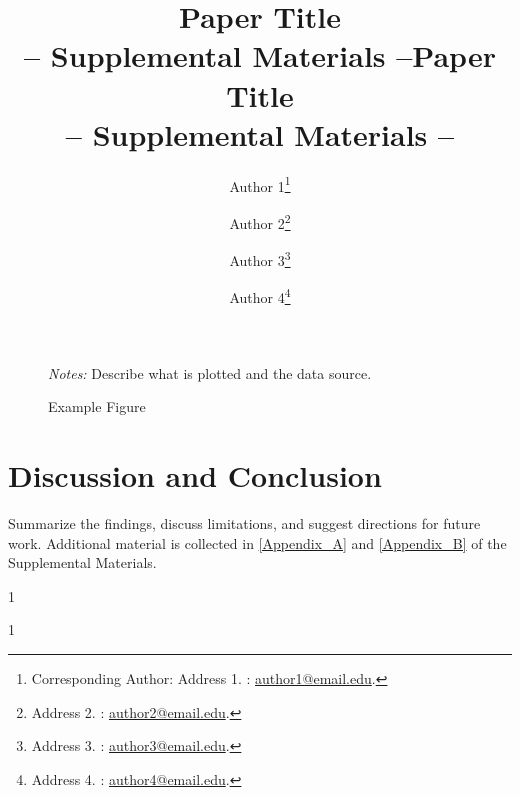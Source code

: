 \documentclass[12pt]{article}
\makeatletter
\newcommand{\blind}{1}
\newcommand{\papertitle}{Paper Title}
\newcommand{\paperauthors}{%
    Author 1\thanks{Corresponding Author: Address 1. \faEnvelopeO: \href{mailto:author1@email.edu}{author1@email.edu}.} \and
    Author 2\thanks{Address 2. \faEnvelopeO: \href{mailto:author2@email.edu}{author2@email.edu}.} \and
    Author 3\thanks{Address 3. \faEnvelopeO: \href{mailto:author3@email.edu}{author3@email.edu}.} \and
    Author 4\thanks{Address 4. \faEnvelopeO: \href{mailto:author4@email.edu}{author4@email.edu}.}%
}
\makeatother
\begin{document}
\begin{bibunit}[jpe]
\begin{figure}[H]
\centering
{}
\caption{Example Figure}
\label{fig:example}
\begin{minipage}{0.9\textwidth}
\footnotesize \textit{Notes:} Describe what is plotted and the data source.
\end{minipage}
\end{figure}

\section{Discussion and Conclusion}\label{sec:conclusion}
Summarize the findings, discuss limitations, and suggest directions for future work. Additional material is collected in \ref{Appendix_A} and \ref{Appendix_B} of the Supplemental Materials.

\putbib[refs]
\end{bibunit}

\emptythanks
\clearpage
\setcounter{page}{1}

\blind
{
  \title{\papertitle\\ -- Supplemental Materials --}
  \author{\paperauthors}
  \maketitle
} \fi

\blind
{
  \bigskip
  \bigskip
  \bigskip
  \title{\bf \papertitle\\ -- Supplemental Materials --}
  \maketitle
  \medskip
} \fi

\setcounter{section}{0}
\appendix

\renewcommand\thesection{Appendix \Alph{section}}

\renewcommand{\thetable}{\Alph{section}-\arabic{table}}
\renewcommand{\thefigure}{\Alph{section}-\arabic{figure}}
\makeatletter
{}
\makeatother
\end{document}
